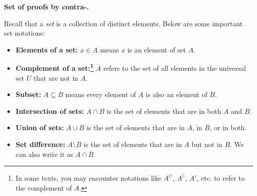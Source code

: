 \documentclass[11pt,addpoints,answers]{exam}
\begin{document}
\begin{questions}

    \question \textbf{Set of proofs by contra-.}
    
    Recall that a \emph{set} is a collection of distinct elements. Below are some important set notations:
    \begin{itemize}
        \item \textbf{Elements of a set:} $x \in A$ means $x$ is an element of set $A$. 
        \item \textbf{Complement of a set:\footnote{In some texts, you may encounter notations like $A^C$, $A^\complement$, $A'$, etc. to refer to the complement of $A$.}} $\overline{A}$ refers to the set of all elements in the universal set $U$ that are not in $A$.
        \item \textbf{Subset:} $A \subseteq B$ means every element of $A$ is also an element of $B$. 
        \item \textbf{Intersection of sets:} $A \cap B$ is the set of elements that are in both $A$ and $B$. 
        \item \textbf{Union of sets:} $A \cup B$ is the set of elements that are in $A$, in $B$, or in both.
        \item \textbf{Set difference:} $A \setminus B$ is the set of elements that are in $A$ but not in $B$. We can also write it as $A \cap \overline{B}$.
    \end{itemize}


\end{questions}
\end{document}

